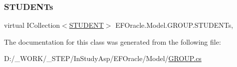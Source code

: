 \mbox{\label{class_e_f_oracle_1_1_model_1_1_g_r_o_u_p_af3e5daacb5c988f3b831964cecbaf133}} 
\subsubsection{\texorpdfstring{S\+T\+U\+D\+E\+N\+Ts}{STUDENTs}}
{\footnotesize\ttfamily virtual I\+Collection$<$\hyperlink{class_e_f_oracle_1_1_model_1_1_s_t_u_d_e_n_t}{S\+T\+U\+D\+E\+NT}$>$ E\+F\+Oracle.\+Model.\+G\+R\+O\+U\+P.\+S\+T\+U\+D\+E\+N\+Ts\hspace{0.3cm}{\ttfamily [get]}, {\ttfamily [set]}}



The documentation for this class was generated from the following file\+:\begin{DoxyCompactItemize}
\item 
D\+:/\+\_\+\+W\+O\+R\+K/\+\_\+\+S\+T\+E\+P/\+In\+Study\+Asp/\+E\+F\+Oracle/\+Model/\hyperlink{_g_r_o_u_p_8cs}{G\+R\+O\+U\+P.\+cs}\end{DoxyCompactItemize}
